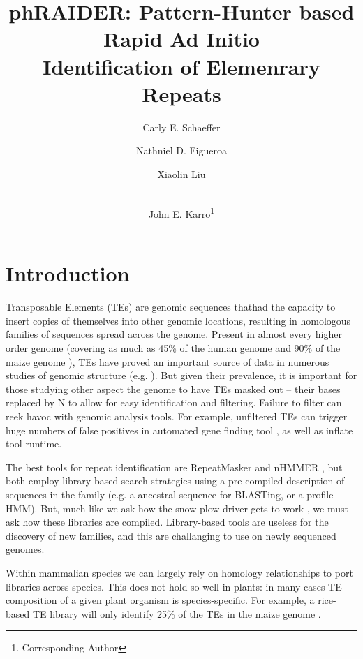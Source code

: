 \documentclass[11pt]{article}
\title{phRAIDER: Pattern-Hunter based Rapid Ad Initio \\ Identification of Elemenrary Repeats}
\author[1]{Carly E. Schaeffer}
\author[1]{Nathniel D. Figueroa}
\author[2]{Xiaolin Liu}
\author[1,2,3,4]{\\John E. Karro\thanks{Corresponding Author}}
\affil[1]{Department of Computer Science and Software Engineering}
\affil[2]{Cell, Molecular, and Structural Bology}
\affil[3]{Department of Microbiology}
\affil[4]{Department of Statisticcs, Miami University, Oxford, Ohio (USA)}
\date{}
\begin{document}
\maketitle
{}

\section*{Introduction}

Transposable Elements (TEs) are genomic sequences thathad the capacity
to insert copies of themselves into other genomic locations, resulting
in homologous families of sequences spread across the genome.  Present
in almost every higher order genome (covering as much as 45\% of the
human genome and 90\% of the maize genome
\cite{Venter:2001p92,SanMiguel:1996wa}), TEs have proved an important
source of data in numerous studies of genomic structure (e.g.
\cite{Arndt:2005p279,Karro:2008p123,Mugal:2009p581,Hardison:2003p97}).
But given their prevalence, it is important for those studying other
aspect the genome to have TEs masked out -- their bases replaced by N
to allow for easy identification and filtering.  Failure to filter can
reek havoc with genomic analysis tools.  For example, unfiltered TEs can trigger
huge numbers of false positives in automated gene finding tool
\cite{Jiang:2013jt}, as well as inflate tool runtime.

The best tools for repeat identification are RepeatMasker and nHMMER
\cite{RepeatMaskerOpen:XkNxXSd7,Wheeler:2013gj}, but both employ 
library-based search strategies using a pre-compiled
description of sequences in the family (e.g. a ancestral sequence for
BLASTing, or a profile HMM).  But, much like we ask how
the snow plow driver gets to work \cite{Pratchett:uw}, we must ask how
these libraries are compiled.  Library-based tools
are useless for the discovery of new families, and this are
challanging to use on newly sequenced genomes.

Within mammalian species we can largely rely on homology relationships
to port libraries across species.  This does not hold
so well in plants: in many cases TE composition of a given plant
organism is species-specific.  For example, a rice-based TE library
will only identify 25\% of the TEs in the maize genome
\cite{Jiang:2013jt}.
\end{document}
